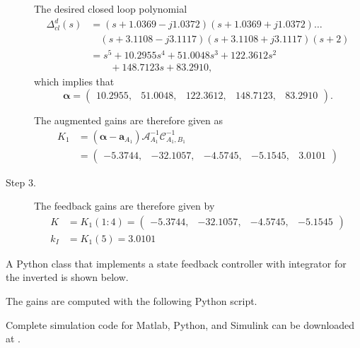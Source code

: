 \begin{description}
The desired closed loop polynomial
\begin{align*}
\Delta_{cl}^d(s) &= (s+1.0369-j1.0372)(s+1.0369+j1.0372)\dots \\
&\quad
(s+3.1108-j3.1117)(s+3.1108+j3.1117)
(s+2) \\          
&=s^5+10.2955s^4+51.0048s^3+122.3612s^2\\ &\qquad +148.7123s+83.2910,
\end{align*}
which implies that
{\small
\[
\boldsymbol{\alpha} = \begin{pmatrix}   10.2955, &   51.0048, &  122.3612, &  148.7123, & 83.2910 \end{pmatrix}.
\]
}

The augmented gains are therefore given as
\begin{align*}
K_1 &= (\boldsymbol{\alpha}-\mathbf{a}_{A_1})\mathcal{A}_{A_1}^{-1}\mathcal{C}_{A_1,B_1}^{-1} \\
  &= \begin{pmatrix} -5.3744, &  -32.1057, &   -4.5745, &   -5.1545, &    3.0101\end{pmatrix}
\end{align*}

\item[Step 3.]
The feedback gains are therefore given by
\begin{align*}
K &= K_1(1:4) = \begin{pmatrix} -5.3744, &  -32.1057, &   -4.5745, &   -5.1545 \end{pmatrix} \\
k_I &= K_1(5) = 3.0101
\end{align*}

\end{description}


A Python class that implements a state feedback controller with integrator for the inverted is shown below.


The gains are computed with the following Python script.


Complete simulation code for Matlab, Python, and Simulink can be downloaded at .

